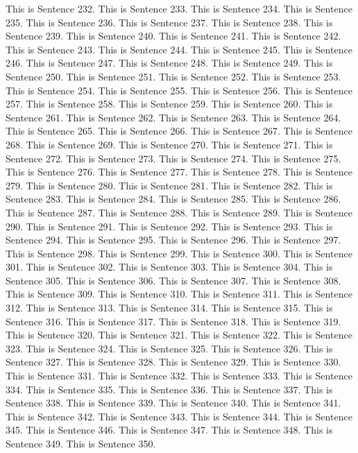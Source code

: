 \documentclass{article}
\begin{document}
This is Sentence 232.
This is Sentence 233.
This is Sentence 234.
This is Sentence 235.
This is Sentence 236.
This is Sentence 237.
This is Sentence 238.
This is Sentence 239.
This is Sentence 240.
This is Sentence 241.
This is Sentence 242.
This is Sentence 243.
This is Sentence 244.
This is Sentence 245.
This is Sentence 246.
This is Sentence 247.
This is Sentence 248.
This is Sentence 249.
This is Sentence 250.
This is Sentence 251.
This is Sentence 252.
This is Sentence 253.
This is Sentence 254.
This is Sentence 255.
This is Sentence 256.
This is Sentence 257.
This is Sentence 258.
This is Sentence 259.
This is Sentence 260.
This is Sentence 261.
This is Sentence 262.
This is Sentence 263.
This is Sentence 264.
This is Sentence 265.
This is Sentence 266.
This is Sentence 267.
This is Sentence 268.
This is Sentence 269.
This is Sentence 270.
This is Sentence 271.
This is Sentence 272.
This is Sentence 273.
This is Sentence 274.
This is Sentence 275.
This is Sentence 276.
This is Sentence 277.
This is Sentence 278.
This is Sentence 279.
This is Sentence 280.
This is Sentence 281.
This is Sentence 282.
This is Sentence 283.
This is Sentence 284.
This is Sentence 285.
This is Sentence 286.
This is Sentence 287.
This is Sentence 288.
This is Sentence 289.
This is Sentence 290.
This is Sentence 291.
This is Sentence 292.
This is Sentence 293.
This is Sentence 294.
This is Sentence 295.
This is Sentence 296.
This is Sentence 297.
This is Sentence 298.
This is Sentence 299.
This is Sentence 300.
This is Sentence 301.
This is Sentence 302.
This is Sentence 303.
This is Sentence 304.
This is Sentence 305.
This is Sentence 306.
This is Sentence 307.
This is Sentence 308.
This is Sentence 309.
This is Sentence 310.
This is Sentence 311.
This is Sentence 312.
This is Sentence 313.
This is Sentence 314.
This is Sentence 315.
This is Sentence 316.
This is Sentence 317.
This is Sentence 318.
This is Sentence 319.
This is Sentence 320.
This is Sentence 321.
This is Sentence 322.
This is Sentence 323.
This is Sentence 324.
This is Sentence 325.
This is Sentence 326.
This is Sentence 327.
This is Sentence 328.
This is Sentence 329.
This is Sentence 330.
This is Sentence 331.
This is Sentence 332.
This is Sentence 333.
This is Sentence 334.
This is Sentence 335.
This is Sentence 336.
This is Sentence 337.
This is Sentence 338.
This is Sentence 339.
This is Sentence 340.
This is Sentence 341.
This is Sentence 342.
This is Sentence 343.
This is Sentence 344.
This is Sentence 345.
This is Sentence 346.
This is Sentence 347.
This is Sentence 348.
This is Sentence 349.
This is Sentence 350.
\end{document}
